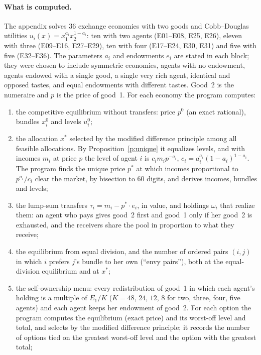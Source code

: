 \documentclass{situationist-preprint}
\begin{document}
\paragraph{What is computed.} The appendix solves 36 exchange economies with two goods and Cobb--Douglas utilities $u_i(x) = x_1^{a_i} x_2^{1 - a_i}$: ten with two agents (E01--E08, E25, E26), eleven with three (E09--E16, E27--E29), ten with four (E17--E24, E30, E31) and five with five (E32--E36). The parameters $a_i$ and endowments $e_i$ are stated in each block; they were chosen to include symmetric economies, agents with no endowment, agents endowed with a single good, a single very rich agent, identical and opposed tastes, and equal endowments with different tastes. Good~2 is the numeraire and $p$ is the price of good~1. For each economy the program computes:
\begin{enumerate}[label=(\roman*),itemsep=0pt]
\item the competitive equilibrium without transfers: price $p^0$ (an exact rational), bundles $x^0_i$ and levels $u^0_i$;
\item the allocation $x^*$ selected by the modified difference principle among all feasible allocations. By Proposition~\ref{p:unique} it equalizes levels, and with incomes $m_i$ at price $p$ the level of agent $i$ is $c_i m_i p^{-a_i}$, $c_i = a_i^{a_i}(1-a_i)^{1-a_i}$. The program finds the unique price $p^*$ at which incomes proportional to $p^{a_i}/c_i$ clear the market, by bisection to $60$ digits, and derives incomes, bundles and levels;
\item the lump-sum transfers $\tau_i = m_i - p^* \cdot e_i$, in value, and holdings $\omega_i$ that realize them: an agent who pays gives good~2 first and good~1 only if her good~2 is exhausted, and the receivers share the pool in proportion to what they receive;
\item the equilibrium from equal division, and the number of ordered pairs $(i, j)$ in which $i$ prefers $j$'s bundle to her own (\enquote{envy pairs}), both at the equal-division equilibrium and at $x^*$;
\item the self-ownership menu: every redistribution of good~1 in which each agent's holding is a multiple of $E_1/K$ ($K = 48$, $24$, $12$, $8$ for two, three, four, five agents) and each agent keeps her endowment of good~2. For each option the program computes the equilibrium (exact price) and its worst-off level and total, and selects by the modified difference principle; it records the number of options tied on the greatest worst-off level and the option with the greatest total;

\end{enumerate}
\end{document}
